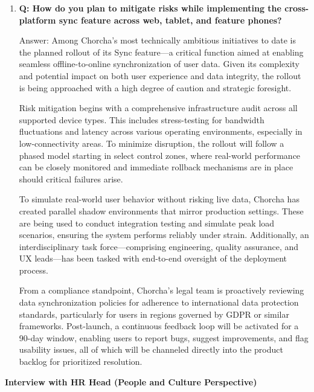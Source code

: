 \documentclass[12pt,a4paper,oneside]{book}
\begin{document}
\begin{enumerate}
\item \textbf{Q: How do you plan to mitigate risks while implementing the cross-platform sync feature across web, tablet, and feature phones?}

Answer: Among Chorcha’s most technically ambitious initiatives to date is the planned rollout of its Sync feature—a critical function aimed at enabling seamless offline-to-online synchronization of user data. Given its complexity and potential impact on both user experience and data integrity, the rollout is being approached with a high degree of caution and strategic foresight.

Risk mitigation begins with a comprehensive infrastructure audit across all supported device types. This includes stress-testing for bandwidth fluctuations and latency across various operating environments, especially in low-connectivity areas. To minimize disruption, the rollout will follow a phased model starting in select control zones, where real-world performance can be closely monitored and immediate rollback mechanisms are in place should critical failures arise.

To simulate real-world user behavior without risking live data, Chorcha has created parallel shadow environments that mirror production settings. These are being used to conduct integration testing and simulate peak load scenarios, ensuring the system performs reliably under strain. Additionally, an interdisciplinary task force—comprising engineering, quality assurance, and UX leads—has been tasked with end-to-end oversight of the deployment process.

From a compliance standpoint, Chorcha’s legal team is proactively reviewing data synchronization policies for adherence to international data protection standards, particularly for users in regions governed by GDPR or similar frameworks. Post-launch, a continuous feedback loop will be activated for a 90-day window, enabling users to report bugs, suggest improvements, and flag usability issues, all of which will be channeled directly into the product backlog for prioritized resolution.
\end{enumerate}

\textbf{Interview with HR Head (People and Culture Perspective)}
\end{document}
